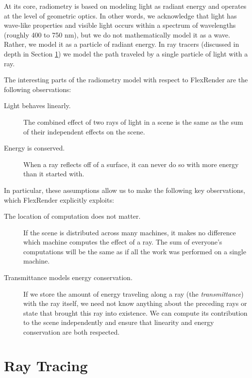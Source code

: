 \documentclass[12pt]{ucthesis}
\begin{document}
At its core, radiometry is based on modeling light as radiant energy and
operates at the level of geometric optics. In other words, we acknowledge that
light has wave-like properties and visible light occurs within a spectrum of
wavelengths (roughly 400 to 750 nm), but we do not mathematically model it as
a wave. Rather, we model it as a particle of radiant energy. In ray tracers
(discussed in depth in Section \ref{raytracing}) we model the path traveled by a single
particle of light with a ray.

The interesting parts of the radiometry model with respect to FlexRender are the
following observations:

\begin{description}
    \item[Light behaves linearly.] The combined effect of two rays of light
        in a scene is the same as the sum of their independent effects on the
        scene.
    \item[Energy is conserved.] When a ray reflects off of a surface, it can
        never do so with more energy than it started with.
\end{description}

In particular, these assumptions allow us to make the following key
observations, which FlexRender explicitly exploits:

\begin{description}
    \item[The location of computation does not matter.] If the scene is
        distributed across many machines, it makes no difference which machine
        computes the effect of a ray. The sum of everyone's computations
        will be the same as if all the work was performed on a single machine.
    \item[Transmittance models energy conservation.] If we store the amount of
        energy traveling along a ray (the \emph{transmittance}) with the ray
        itself, we need not know anything about the preceding rays or state
        that brought this ray into existence. We can compute its contribution
        to the scene independently and ensure that linearity and energy
        conservation are both respected.
\end{description}

\section{Ray Tracing}
\label{raytracing}
\end{document}
